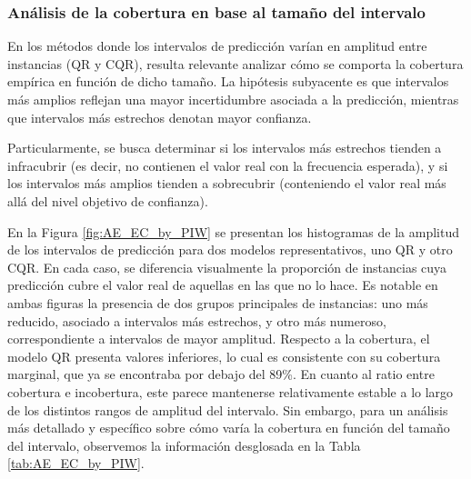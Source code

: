 \subsubsection{Análisis de la cobertura en base al tamaño del intervalo}

En los métodos donde los intervalos de predicción varían en amplitud entre instancias (QR y CQR), resulta 
relevante analizar cómo se comporta la cobertura empírica en función de dicho tamaño. La hipótesis subyacente 
es que intervalos más amplios reflejan una mayor incertidumbre asociada a la predicción, mientras que 
intervalos más estrechos denotan mayor confianza.

Particularmente, se busca determinar si los intervalos más estrechos tienden a infracubrir (es decir, no 
contienen el valor real con la frecuencia esperada), y si los intervalos más amplios tienden a sobrecubrir 
(conteniendo el valor real más allá del nivel objetivo de confianza).

En la Figura \ref{fig:AE_EC_by_PIW} se presentan los histogramas de la amplitud de los intervalos de 
predicción para dos modelos representativos, uno QR y otro CQR. En cada caso, se diferencia visualmente la 
proporción de instancias cuya predicción cubre el valor real de aquellas en las que no lo hace. Es notable 
en ambas figuras la presencia de dos grupos principales de instancias: uno más reducido, asociado a intervalos 
más estrechos, y otro más numeroso, correspondiente a intervalos de mayor amplitud.
Respecto a la cobertura, el modelo QR presenta valores inferiores, lo cual es consistente con su cobertura
marginal, que ya se encontraba por debajo del 89\%. En cuanto al ratio entre cobertura e incobertura, este 
parece mantenerse relativamente estable a lo largo de los distintos rangos de amplitud del intervalo. Sin 
embargo, para un análisis más detallado y específico sobre cómo varía la cobertura en función del tamaño del 
intervalo, observemos la información desglosada en la Tabla \ref{tab:AE_EC_by_PIW}.




